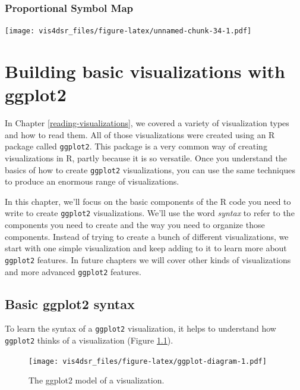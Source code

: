 \documentclass[
]{krantz}
\begin{document}
\hypertarget{proportional-symbol-map}{%
\subsection{Proportional Symbol Map}\label{proportional-symbol-map}}

\texttt{[image: vis4dsr\_files/figure-latex/unnamed-chunk-34-1.pdf]}

\hypertarget{building-basic-visualizations}{%
\chapter{Building basic visualizations with ggplot2}\label{building-basic-visualizations}}

In Chapter \ref{reading-visualizations}, we covered a variety of visualization types
and how to read them. All
of those visualizations were created using an R package called \texttt{ggplot2}. This
package is a very common way of creating visualizations in R, partly because it is
so versatile. Once you understand the basics of how to create \texttt{ggplot2} visualizations,
you can use the same techniques to produce an enormous range of visualizations.

In this chapter, we'll focus on the basic components of the R code you need to write
to create \texttt{ggplot2} visualizations. We'll use the word \emph{syntax} to refer to the
components you need to create and the way you need to organize those components.
Instead of trying to create a bunch of different visualizations, we start with one
simple visualization and keep adding to it to learn more about \texttt{ggplot2} features.
In future chapters we will cover other kinds of visualizations and more advanced
\texttt{ggplot2} features.

\hypertarget{basic-ggplot2-syntax}{%
\section{Basic ggplot2 syntax}\label{basic-ggplot2-syntax}}

To learn the syntax of a \texttt{ggplot2} visualization, it helps to understand how
\texttt{ggplot2} thinks of a visualization (Figure \ref{fig:ggplot-diagram}).

\begin{figure}
\centering
\texttt{[image: vis4dsr\_files/figure-latex/ggplot-diagram-1.pdf]}
\caption{\label{fig:ggplot-diagram}The ggplot2 model of a visualization.}
\end{figure}
\end{document}
